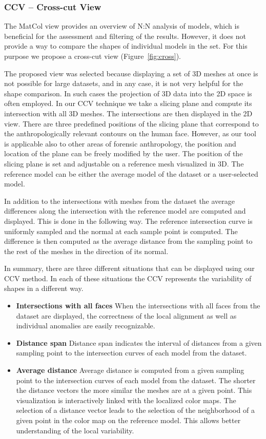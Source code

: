 \documentclass[final,5p,times]{elsarticle}
\begin{document}
\subsubsection{CCV -- Cross-cut View}
The MatCol view provides an overview of N:N analysis of models, which is beneficial for the assessment and filtering of the results. 
However, it does not provide a way to compare the shapes of individual models in the set.
For this purpose we propose a cross-cut view (Figure~\ref{fig:cross}).

The proposed view was selected because displaying a set of 3D meshes at once is not possible for large datasets, and in any case, it is not very helpful for the shape comparison. 
In such cases the projection of 3D data into the 2D space is often employed.
In our CCV technique we take a slicing plane and compute its intersection with all 3D meshes.
The intersections are then displayed in the 2D view.
There are three predefined positions of the slicing plane that correspond to the anthropologically relevant contours on the human face. 
However, as our tool is applicable also to other areas of forensic anthropology, the position and location of the plane can be freely modified by the user.
The position of the slicing plane is set and adjustable on a reference mesh visualized in 3D.
The reference model can be either the average model of the dataset or a user-selected model.

In addition to the intersections with meshes from the dataset the average differences along the intersection with the reference model are computed and displayed.
This is done in the following way.
The reference intersection curve is uniformly sampled and the normal at each sample point is computed.
The difference is then computed as the average distance from the sampling point to the rest of the meshes in the direction of its normal.

In summary, there are three different situations that can be displayed using our CCV method.
In each of these situations the CCV represents the variability of shapes in a different way.
\begin{itemize}
\item{\textbf{Intersections with all faces}}
When the intersections with all faces from the dataset are displayed, the correctness of the local alignment as well as individual anomalies are easily recognizable.
\item{\textbf{Distance span}}
Distance span indicates the interval of distances from a given sampling point to the intersection curves of each model from the dataset. 
\item{\textbf{Average distance}}
Average distance is computed from a given sampling point to the intersection curves of each model from the dataset. 
The shorter the distance vectors the more similar the meshes are at a given point.
This visualization is interactively linked with the localized color maps.
The selection of a distance vector leads to the selection of the neighborhood of a given point in the color map on the reference model.
This allows better understanding of the local variability.
\end{itemize}
\end{document}
